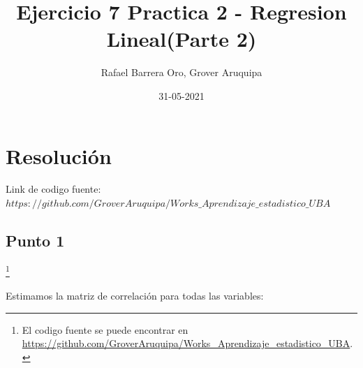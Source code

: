 \documentclass[a4paper]{article}
\title{Ejercicio 7 Practica 2 - Regresion Lineal(Parte 2)}
\author{Rafael Barrera Oro, Grover Aruquipa}
\date{31-05-2021}
\begin{document}
\maketitle

\newpage


\newpage



\section{Resolución}
Link de codigo fuente: $https://github.com/GroverAruquipa/Works\_Aprendizaje\_estadistico\_UBA$

\subsection{Punto 1}
\footnote{El codigo fuente se puede encontrar en \url{https://github.com/GroverAruquipa/Works_Aprendizaje_estadistico_UBA}.}

Estimamos la matriz de correlación para todas las variables:
\end{document}
